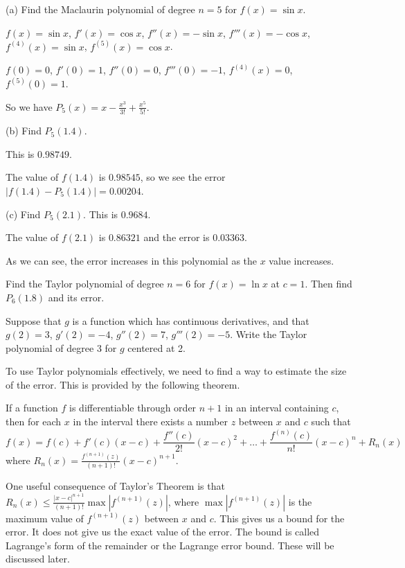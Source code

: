 \documentclass[../bccalc.tex]{subfiles}
\begin{document}
\begin{example}
    (a) Find the Maclaurin polynomial of degree $n=5$ for $f(x)=\sin x$.

    $f(x)=\sin x$, $f'(x)=\cos x$, $f''(x)=-\sin x$, $f'''(x)=-\cos x$, $f^{(4)}(x)=\sin x$, $f^{(5)}(x)=\cos x$.

    $f(0)=0$, $f'(0)=1$, $f''(0)=0$, $f'''(0)=-1$, $f^{(4)}(x)=0$, $f^{(5)}(0)=1$.

    So we have $P_5(x)=x-\frac{x^3}{3!}+\frac{x^5}{5!}$.

    (b) Find $P_5(1.4)$.

    This is $0.98749$.

    The value of $f(1.4)$ is $0.98545$, so we see the error $|f(1.4)-P_5(1.4)|=0.00204$.

    (c) Find $P_5(2.1)$. This is $0.9684$.

    The value of $f(2.1)$ is $0.86321$ and the error is $0.03363$.

    As we can see, the error increases in this polynomial as the $x$ value increases.
\end{example}

\ex Find the Taylor polynomial of degree $n=6$ for $f(x)=\ln x$ at $c=1$. Then find $P_6(1.8)$ and its error.

\ex Suppose that $g$ is a function which has continuous derivatives, and that $g(2)=3$, $g'(2)=-4$, $g''(2)=7$, $g'''(2)=-5$. Write the Taylor polynomial of degree 3 for $g$ centered at 2.

To use Taylor polynomials effectively, we need to find a way to estimate the size of the error. This is provided by the following theorem.

\begin{theorem}
    If a function $f$ is differentiable through order $n+1$ in an interval containing $c$, then for each $x$ in the interval there exists a number $z$ between $x$ and $c$ such that 
    \[ f(x)=f(c)+f'(c)(x-c)+\frac{f''(c)}{2!}(x-c)^2+\dots+\frac{f^{(n)}(c)}{n!}(x-c)^n+R_n(x) \]
    where $R_n(x)=\frac{f^{(n+1)}(z)}{(n+1)!}(x-c)^{n+1}$.
\end{theorem}

One useful consequence of Taylor's Theorem is that $R_n(x)\leq \frac{|x-c|^{n+1}}{(n+1)!}\max |f^{(n+1)}(z)|$, where $\max |f^{(n+1)}(z)|$ is the maximum value of 
$f^{(n+1)}(z)$ between $x$ and $c$. This gives us a bound for the error. It does not give us the exact value of the error. The bound is called Lagrange's form of the remainder or the Lagrange error bound. These will be discussed later.
\end{document}
